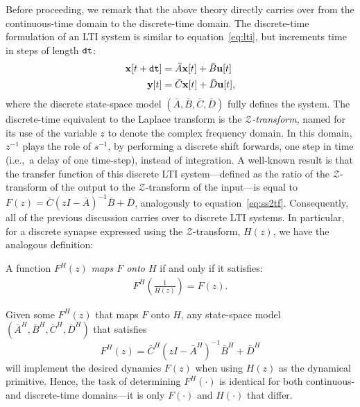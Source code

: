 Before proceeding, we remark that the above theory directly carries over from the continuous-time domain to the discrete-time domain.
The discrete-time formulation of an LTI system is similar to equation~\ref{eq:lti}, but increments time in steps of length $\texttt{dt}{}$:
\begin{equation} \label{eq:dlti}
\begin{split}
\mathbf{x}[t+\texttt{dt}{}] &= \bar{A}\mathbf{x}[t] + \bar{B}\mathbf{u}[t] \\
\mathbf{y}[t] &= \bar{C}\mathbf{x}[t] + \bar{D}\mathbf{u}[t] \text{,}
\end{split}
\end{equation}
where the discrete state-space model $\left( \bar{A}\text{,}\, \bar{B}\text{,}\, \bar{C}\text{,}\, \bar{D} \right)$ fully defines the system.
The discrete-time equivalent to the Laplace transform is the $\mathcal{Z}$\emph{-transform}, named for its use of the variable $z$ to denote the complex frequency domain.
In this domain, $z^{-1}$ plays the role of $s^{-1}$, by performing a discrete shift forwards, one step in time (i.e.,~a delay of one time-step), instead of integration.
A well-known result is that the transfer function of this discrete LTI system---defined as the ratio of the $\mathcal{Z}$-transform of the output to the $\mathcal{Z}$-transform of the input---is equal to $F(z) = \bar{C} (zI - \bar{A})^{-1} \bar{B} + \bar{D}$, analogously to equation~\ref{eq:ss2tf}.
Consequently, all of the previous discussion carries over to discrete LTI systems.
In particular, for a discrete synapse expressed using the $\mathcal{Z}$-transform, $H(z)$, we have the analogous definition:
\begin{definition} \label{def:discrete-maps-onto}
A function $F^{H}(z)$ \emph{maps $F$ onto $H$} if and only if it satisfies:
\begin{align} \label{eq:discrete-maps-onto}
F^{H}\left( \frac{1}{H(z)} \right) = F(z) \text{.}
\end{align}
\end{definition}
Given some $F^{H}(z)$ that maps $F$ onto $H$, any state-space model $\left( \bar{A}^H\text{,}\, \bar{B}^H\text{,}\, \bar{C}^H\text{,}\, \bar{D}^H \right)$ that satisfies
\begin{equation} \label{eq:dss-mapped}
F^{H} \left( z \right) = \bar{C}^H \left( zI - \bar{A}^H \right)^{-1}\bar{B}^H + \bar{D}^H
\end{equation}
will implement the desired dynamics $F(z)$ when using $H(z)$ as the dynamical primitive.
Hence, the task of determining $F^{H}(\cdot)$ is identical for both continuous- and discrete-time domains---it is only $F(\cdot)$ and $H(\cdot)$ that differ.

